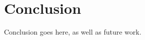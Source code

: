 \documentclass[times, utf8, diplomski]{fer}
\begin{document}
%
%
%
%















\chapter{Conclusion}\label{ch:conclusion}
Conclusion goes here, as well as future work.
\end{document}
